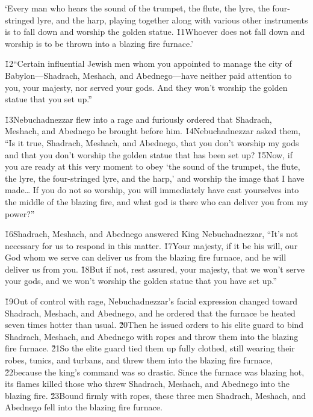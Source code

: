 \begin{poetry}
\poeml `Every man who hears the sound of the trumpet, the flute, the lyre, the four-stringed lyre, and the harp, playing together along with various other instruments is to fall down and worship the golden statue. \v{11}Whoever does not fall down and worship is to be thrown into a blazing fire furnace.'
\end{poetry}

\v{12}``Certain influential Jewish men whom you appointed to manage the city of Babylon---Shadrach, Meshach, and Abednego---have neither paid attention to you, your majesty, nor served your gods. And they won't worship the golden statue that you set up.''

\v{13}Nebuchadnezzar flew into a rage and furiously ordered that Shadrach, Meshach, and Abednego be brought before him. \v{14}Nebuchadnezzar asked them, ``Is it true, Shadrach, Meshach, and Abednego, that you don't worship my gods and that you don't worship the golden statue that has been set up? \v{15}Now, if you are ready at this very moment to obey `the sound of the trumpet, the flute, the lyre, the four-stringed lyre, and the harp,' and worship the image that I have made{\ldots} If you do not so worship, you will immediately have cast yourselves into the middle of the blazing fire, and what god is there who can deliver you from my power?''

\v{16}Shadrach, Meshach, and Abednego answered King Nebuchadnezzar, ``It's not necessary for us to respond in this matter. \v{17}Your majesty, if it be his will, our God whom we serve can deliver us from the blazing fire furnace, and he will deliver us from you. \v{18}But if not, rest assured, your majesty, that we won't serve your gods, and we won't worship the golden statue that you have set up.''

\v{19}Out of control with rage, Nebuchadnezzar's facial expression changed toward Shadrach, Meshach, and Abednego, and he ordered that the furnace be heated seven times hotter than usual. \v{20}Then he issued orders to his elite guard to bind Shadrach, Meshach, and Abednego with ropes and throw them into the blazing fire furnace. \v{21}So the elite guard tied them up fully clothed, still wearing their robes, tunics, and turbans, and threw them into the blazing fire furnace, \v{22}because the king's command was so drastic. Since the furnace was blazing hot, its flames killed those who threw Shadrach, Meshach, and Abednego into the blazing fire. \v{23}Bound firmly with ropes, these three men Shadrach, Meshach, and Abednego fell into the blazing fire furnace.

